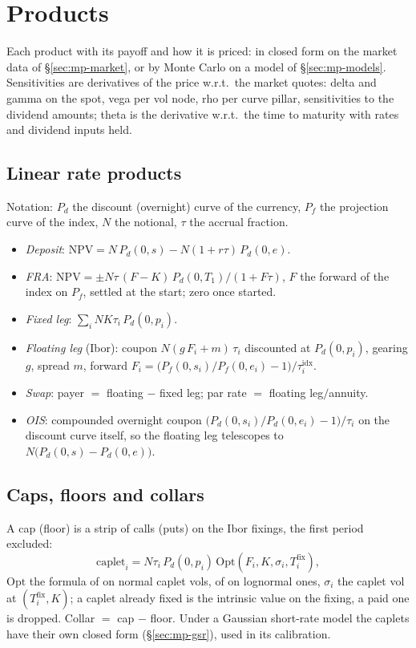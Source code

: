 \section{Products}\label{sec:mp-products}
Each product with its payoff and how it is priced: in closed form on the market data of \S\ref{sec:mp-market}, or by
Monte Carlo on a model of \S\ref{sec:mp-models}. Sensitivities are derivatives of the price w.r.t.\ the market quotes:
delta and gamma on the spot, vega per vol node, rho per curve pillar, sensitivities to the dividend amounts; theta is
the derivative w.r.t.\ the time to maturity with rates and dividend inputs held.

\subsection{Linear rate products}\label{sec:mp-linear}
Notation: $P_d$ the discount (overnight) curve of the currency, $P_f$ the projection curve of the index, $N$ the
notional, $\tau$ the accrual fraction.
\begin{itemize}[nosep]
  \item \emph{Deposit}: $\mathrm{NPV} = N\,P_d(0,s) - N(1 + r\tau)\,P_d(0,e)$.
  \item \emph{FRA}: $\mathrm{NPV} = \pm N\tau\,(F - K)\,P_d(0,T_1)/(1 + F\tau)$, $F$ the forward of the index on $P_f$, settled at the
        start; zero once started.
  \item \emph{Fixed leg}: $\sum_i N K \tau_i\,P_d(0,p_i)$.
  \item \emph{Floating leg} (Ibor): coupon $N(g\,F_i + m)\,\tau_i$ discounted at $P_d(0,p_i)$, gearing $g$, spread $m$,
        forward $F_i = \big(P_f(0,s_i)/P_f(0,e_i) - 1\big)/\tau^{\mathrm{idx}}_i$.
  \item \emph{Swap}: payer $=$ floating $-$ fixed leg; par rate $=$ floating leg$/$annuity.
  \item \emph{OIS}: compounded overnight coupon $\big(P_d(0,s_i)/P_d(0,e_i) - 1\big)/\tau_i$ on the discount curve itself, so
        the floating leg telescopes to $N\big(P_d(0,s) - P_d(0,e)\big)$.
\end{itemize}

\subsection{Caps, floors and collars}\label{sec:mp-capfloor}
A cap (floor) is a strip of calls (puts) on the Ibor fixings, the first period excluded:
\[
  \mathrm{caplet}_i = N\tau_i\,P_d(0,p_i)\,\mathrm{Opt}(F_i, K, \sigma_i, T^{\mathrm{fix}}_i),
\]
$\mathrm{Opt}$ the formula of \citet{bachelier1900} on normal caplet vols, of \citet{black1976} on lognormal ones, $\sigma_i$ the caplet
vol at $(T^{\mathrm{fix}}_i, K)$; a caplet already fixed is the intrinsic value on the fixing, a paid one is dropped.
Collar $=$ cap $-$ floor. Under a Gaussian short-rate model the caplets have their own closed form (\S\ref{sec:mp-gsr}),
used in its calibration.

